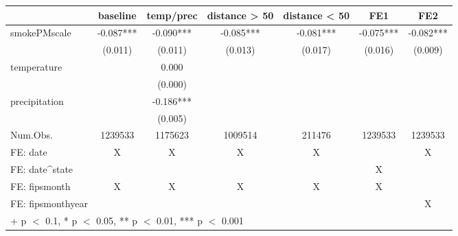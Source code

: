 \begin{table}
\centering
\begin{tabular}[t]{lcccccc}
\toprule
  & baseline & temp/prec & distance > 50 & distance < 50 & FE1 & FE2\\
\midrule
smokePMscale & -0.087*** & -0.090*** & -0.085*** & -0.081*** & -0.075*** & -0.082***\\
 & (0.011) & (0.011) & (0.013) & (0.017) & (0.016) & (0.009)\\
temperature &  & 0.000 &  &  &  & \\
 &  & (0.000) &  &  &  & \\
precipitation &  & -0.186*** &  &  &  & \\
 &  & (0.005) &  &  &  & \\
\midrule
Num.Obs. & 1239533 & 1175623 & 1009514 & 211476 & 1239533 & 1239533\\
FE: date & X & X & X & X &  & X\\
FE: date^state &  &  &  &  & X & \\
FE: fipsmonth & X & X & X & X & X & \\
FE: fipsmonthyear &  &  &  &  &  & X\\
\bottomrule
\multicolumn{7}{l}{\rule{0pt}{1em}+ p $<$ 0.1, * p $<$ 0.05, ** p $<$ 0.01, *** p $<$ 0.001}\\
\end{tabular}
\end{table}
